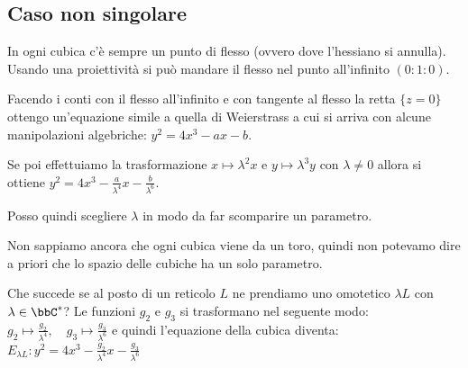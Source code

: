 
\subsection{Caso non singolare}
In ogni cubica c'è sempre un punto di flesso (ovvero dove l'hessiano si
annulla). Usando una proiettività si può mandare il flesso nel punto
all'infinito $(0 : 1 : 0)$.


Facendo i conti con il flesso all'infinito e con tangente al flesso la
retta $\{ z = 0 \}$ ottengo un'equazione simile a quella di Weierstrass
a cui si arriva con alcune manipolazioni algebriche:
$y^2 = 4 x^3 - a x - b$.

Se poi effettuiamo la trasformazione $x \mapsto \lambda^2 x$ e $y
\mapsto \lambda^3 y$ con $\lambda \neq 0$ allora si ottiene $y^2 = 4 x^3
- \frac{a}{\lambda^4} x - \frac{b}{\lambda^6}$.

Posso quindi scegliere $\lambda$ in modo da far scomparire un parametro.

\begin{osservazione}
  Non sappiamo ancora che ogni cubica viene da un toro, quindi non
  potevamo dire a priori che lo spazio delle cubiche ha un solo
  parametro.
\end{osservazione}

Che succede se al posto di un reticolo $L$ ne prendiamo uno omotetico
$\lambda L$ con $\lambda \in \bbC^*$? Le funzioni $g_2$ e $g_3$ si
trasformano nel seguente modo:
$ g_2 \mapsto \frac{g_2}{\lambda^4} ,\quad g_3 \mapsto
\frac{g_3}{\lambda^6}$ e quindi l'equazione della cubica diventa:
$E_{\lambda L}: y^2 = 4x^3 - \frac{g_2}{\lambda^4} x -
\frac{g_3}{\lambda^6}$

